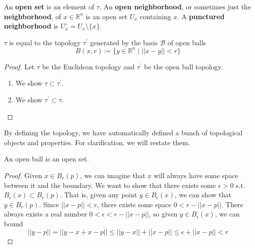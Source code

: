 \documentclass{article}
\begin{document}
      \begin{definition}
        An \textbf{open set} is an element of $\tau$. An \textbf{open neighborhood}, or sometimes just the \textbf{neighborhood}, of $x \in \mathbb{R}^n$ is an open set $U_x$ containing $x$. A \textbf{punctured neighborhood} is $U_x^{\circ} = U_x \setminus \{x\}$. 
      \end{definition}

      \begin{theorem}
        $\tau$ is equal to the topology $\tau^\prime$ generated by the basis $\mathscr{B}$ of open balls 
        \begin{equation} 
          B(x, r) \coloneqq \{ y \in \mathbb{R}^n \mid ||x - y|| < r\}
        \end{equation}
      \end{theorem} 
      \begin{proof}
        Let $\tau$ be the Euclidean topology and $\tau^\prime$ be the open ball topology. 
        \begin{enumerate}
          \item We show $\tau \subset \tau^\prime$. 
          \item We show $\tau^\prime \subset \tau$. 
        \end{enumerate}
      \end{proof} 

      By defining the topology, we have automatically defined a bunch of topological objects and properties. For clarification, we will restate them. 
      
      \begin{corollary}
        An open ball is an open set. 
      \end{corollary}
      \begin{proof}
        Given $x \in B_r (p)$, we can imagine that $x$ will always have some space between it and the boundary. We want to show that there exists some $\epsilon >0$ s.t. $B_\epsilon (x) \subset B_r (p)$. That is, given any point $y \in B_\epsilon (x)$, we can show that $y \in B_r (p)$. Since $||x - p|| < r$, there exists some space $0 < r - ||x - p||$. There always exists a real number $0 < \epsilon < r - ||x - p||$, so given $y \in B_\epsilon (x)$, we can bound
        \begin{equation}
          ||y - p|| = ||y - x + x - p|| \leq ||y - x|| + ||x - p|| \leq \epsilon + ||x - p|| < r
        \end{equation}
      \end{proof}
\end{document}
